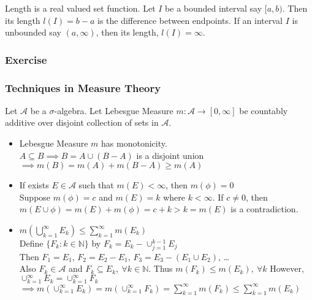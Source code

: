 \begin{definition}
	Length is a real valued set function.
	Let $I$ be a bounded interval say $[a,b)$.
	Then its length $l(I)=b-a$ is the difference between endpoints.
	If an interval $I$ is unbounded say $(a,\infty)$, then its length, $l(I) = \infty$.
\end{definition}


\subsubsection{Exercise}
\subsubsection{Techniques in Measure Theory}
	Let $\mathcal{A}$ be a $\sigma$-algebra.
	Let Lebesgue Measure $m : \mathcal{A} \to [0,\infty]$ be countably additive over disjoint collection of sets in $\mathcal{A}$.
\begin{itemize}
	\item Lebesgue Measure $m$ has monotonicity.\\
		$A \subseteq B \implies B = A \cup (B-A)$ is a disjoint union \\
		$\implies m(B) = m(A) + m(B-A) \ge m(A)$
	\item If exists $E \in \mathcal{A}$ such that $m(E) < \infty$, then $m(\phi) = 0$\\
		Suppose $m(\phi) = c$ and $m(E) = k$ where $k < \infty$.
		If $c \ne 0$, then $m(E \cup \phi) = m(E) + m(\phi) = c+k > k = m(E)$ is a contradiction.
	\item $m\left(\displaystyle\bigcup_{k=1}^\infty E_k\right) \le \displaystyle\sum_{k=1}^\infty m(E_k)$\\
		Define $\{ F_k : k \in \mathbb{N} \}$ by $F_k = E_k - \cup_{j = 1}^{k-1} E_j$\\
		Then $F_1 = E_1$, $F_2 = E_2 - E_1$, $F_3 = E_3 - (E_1 \cup E_2)$, \dots\\
		Also $F_k \in \mathcal{A}$ and $F_k \subseteq E_k,\ \forall k \in \mathbb{N}$.
		Thus $m(F_k) \le m(E_k),\ \forall k$
		However, $\cup_{k=1}^\infty E_k = \cup_{k=1}^\infty F_k$\\
		$\implies m\left( \cup_{k=1}^\infty E_k \right) = m \left( \cup_{k=1}^\infty F_k \right) = \displaystyle\sum_{k=1}^\infty m(F_k) \le \displaystyle\sum_{k=1}^\infty m(E_k)$
\end{itemize}

